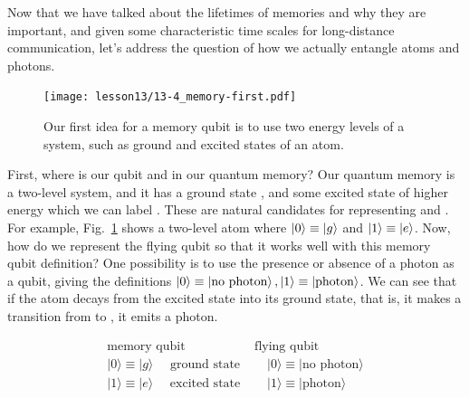 Now that we have talked about the lifetimes of memories and why they are important, and given some characteristic time scales for long-distance communication, let's address the question of how we actually entangle atoms and photons.

\begin{figure}[t]
    \centering
    \texttt{[image: lesson13/13-4\_memory-first.pdf]}
    \caption[First idea for memory]{Our first idea for a memory qubit is to use two energy levels of a system, such as ground and excited states of an atom.}
    \label{fig:13-memory-first}
\end{figure}

First, where is our qubit  and  in our quantum memory? Our quantum memory is a two-level system, and it has a ground state , and some excited state of higher energy which we can label . These are natural candidates for representing  and . For example, Fig.~\ref{fig:13-memory-first} shows a two-level atom where $\left| 0 \right\rangle\equiv\left| g \right\rangle$ and $\left| 1 \right\rangle\equiv\left| e \right\rangle$. Now, how do we represent the flying qubit so that it works well with this memory qubit definition? One possibility is to use the presence or absence of a photon as a qubit, giving the definitions $\left| 0 \right\rangle\equiv\left| \textrm{no photon} \right\rangle,\left| 1 \right\rangle\equiv\left| \textrm{photon} \right\rangle$.
We can see that if the atom decays from the excited state into its ground state, that is, it makes a transition from  to , it emits a photon.

\begin{equation}
\begin{array}{ll}
\text{memory qubit} & \text{flying qubit} \\

|0\rangle \equiv|g\rangle \quad \text { ground state } & \quad|0\rangle \equiv \mid \text {no photon}\rangle \\
|1\rangle \equiv|e\rangle \quad \text { excited state } & \quad|1\rangle \equiv \mid \text {photon}\rangle \\
\end{array}
\end{equation}

